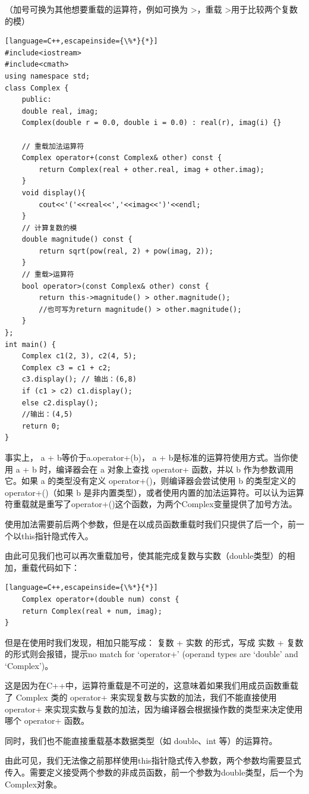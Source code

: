 \documentclass[UTF8]{ctexart}
\begin{document}
（加号可换为其他想要重载的运算符，例如可换为 >，重载 >用于比较两个复数的模）
\begin{lstlisting}[language=C++,escapeinside={\%*}{*}]
#include<iostream>
#include<cmath>
using namespace std;
class Complex {
	public:
	double real, imag;
	Complex(double r = 0.0, double i = 0.0) : real(r), imag(i) {}
	
	// 重载加法运算符
	Complex operator+(const Complex& other) const {
		return Complex(real + other.real, imag + other.imag);
	}  
	void display(){
		cout<<'('<<real<<','<<imag<<')'<<endl;
	}
	// 计算复数的模
	double magnitude() const {
		return sqrt(pow(real, 2) + pow(imag, 2));
	}
	// 重载>运算符
	bool operator>(const Complex& other) const {
		return this->magnitude() > other.magnitude();
		//也可写为return magnitude() > other.magnitude();
	}
};
int main() {
	Complex c1(2, 3), c2(4, 5);
	Complex c3 = c1 + c2;
	c3.display(); // 输出：(6,8)
	if (c1 > c2) c1.display();
	else c2.display();
	//输出：(4,5)
	return 0;
}
\end{lstlisting}
事实上， a + b等价于a.operator+(b)， a + b是标准的运算符使用方式。当你使用 a + b 时，编译器会在 a 对象上查找 operator+ 函数，并以 b 作为参数调用它。如果 a 的类型没有定义 operator+()，则编译器会尝试使用 b 的类型定义的 operator+()（如果 b 是非内置类型），或者使用内置的加法运算符。可以认为运算符重载就是重写了operator+()这个函数，为两个Complex变量提供了加号方法。

使用加法需要前后两个参数，但是在以成员函数重载时我们只提供了后一个，前一个以this指针隐式传入。

由此可见我们也可以再次重载加号，使其能完成复数与实数（double类型）的相加，重载代码如下：
\begin{lstlisting}[language=C++,escapeinside={\%*}{*}]
    Complex operator+(double num) const {
	return Complex(real + num, imag);
}
\end{lstlisting}
但是在使用时我们发现，相加只能写成： 复数 + 实数
的形式，写成  实数 + 复数 的形式则会报错，提示no match for ‘operator+’ (operand types are ‘double’ and ‘Complex’)。

这是因为在C++中，运算符重载是不可逆的，这意味着如果我们用成员函数重载了 Complex 类的 operator+ 来实现复数与实数的加法，我们不能直接使用 operator+ 来实现实数与复数的加法，因为编译器会根据操作数的类型来决定使用哪个 operator+ 函数。

同时，我们也不能直接重载基本数据类型（如 double、int 等）的运算符。

由此可见，我们无法像之前那样使用this指针隐式传入参数，两个参数均需要显式传入。需要定义接受两个参数的非成员函数，前一个参数为double类型，后一个为Complex对象。
\end{document}
